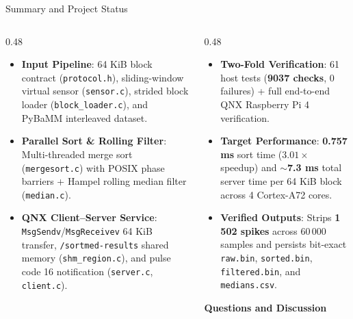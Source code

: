 \begin{frame}{Summary and Project Status}
  \begin{columns}[t, onlytextwidth]
    \begin{column}{0.48\textwidth}
      \smalltext\compactitem
      \begin{itemize}
        \item \textbf{Input Pipeline}: 64 KiB block contract (\texttt{protocol.h}), sliding-window virtual sensor (\texttt{sensor.c}), strided block loader (\texttt{block\_loader.c}), and PyBaMM interleaved dataset.
        \item \textbf{Parallel Sort \& Rolling Filter}: Multi-threaded merge sort (\texttt{mergesort.c}) with POSIX phase barriers + Hampel rolling median filter (\texttt{median.c}).
        \item \textbf{QNX Client--Server Service}: \texttt{MsgSendv}/\texttt{MsgReceivev} 64 KiB transfer, \texttt{/sortmed-results} shared memory (\texttt{shm\_region.c}), and pulse code 16 notification (\texttt{server.c}, \texttt{client.c}).
      \end{itemize}
    \end{column}
    \begin{column}{0.48\textwidth}
      \smalltext\compactitem
      \begin{itemize}
        \item \textbf{Two-Fold Verification}: 61 host tests (\textbf{9037 checks}, 0 failures) + full end-to-end QNX Raspberry Pi 4 verification.
        \item \textbf{Target Performance}: \textbf{0.757 ms} sort time ($3.01\times$ speedup) and \textbf{$\sim$7.3 ms} total server time per 64 KiB block across 4 Cortex-A72 cores.
        \item \textbf{Verified Outputs}: Strips \textbf{1\,502 spikes} across 60\,000 samples and persists bit-exact \texttt{raw.bin}, \texttt{sorted.bin}, \texttt{filtered.bin}, and \texttt{medians.csv}.
      \end{itemize}
      \vskip1.5mm
      \begin{center}
        {\color{rtmPrimary}\large\bfseries Questions and Discussion}
      \end{center}
    \end{column}
  \end{columns}
\end{frame}

\closingSlide


